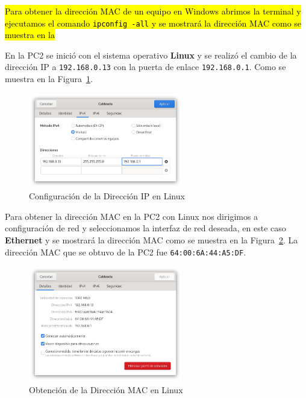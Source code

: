         \hl{Para obtener la dirección MAC de un equipo en Windows abrimos la terminal y ejecutamos el comando \texttt{ipconfig -all} y se mostrará la dirección MAC como se muestra en la }


        En la PC2 se inició con el sistema operativo \textbf{Linux} y se realizó el cambio de la dirección IP a \texttt{192.168.0.13} con la puerta de enlace \texttt{192.168.0.1}. Como se muestra en la Figura~\ref{fig:ip_linux}.

        \begin{figure}[H]
            \centering
            \includegraphics[width=0.6\textwidth]{img/cambiar_IP_Linux.png}
            \caption{Configuración de la Dirección IP en Linux}
            \label{fig:ip_linux}
        \end{figure}
        
        Para obtener la dirección MAC en la PC2 con Linux nos dirigimos a configuración de red y seleccionamos la interfaz de red deseada, en este caso \textbf{Ethernet} y se mostrará la dirección MAC como se muestra en la Figura~\ref{fig:mac_linux}. La dirección MAC que se obtuvo de la PC2 fue \texttt{64:00:6A:44:A5:DF}.
        \begin{figure}[H]
            \centering
            \includegraphics[width=0.6\textwidth]{img/direccion_MAC_linux.png}
            \caption{Obtención de la Dirección MAC en Linux}
            \label{fig:mac_linux}
        \end{figure}

